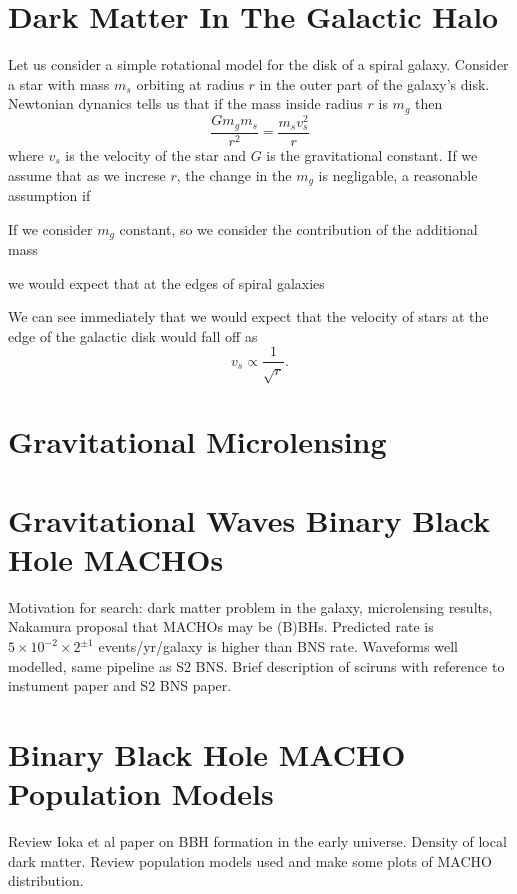 
\section{Dark Matter In The Galactic Halo}

Let us consider a simple rotational model for the disk of a spiral galaxy.
Consider a star with mass $m_s$ orbiting at radius $r$ in the outer part
of the galaxy's disk. Newtonian dynanics tells us that if the mass inside
radius $r$ is $m_g$ then
\begin{equation}
\frac{Gm_g m_s}{r^2} = \frac{m_s v_s^2}{r}
\end{equation}
where $v_s$ is the velocity of the star and $G$ is the gravitational constant. 
If we assume that as we increse $r$, the change in the $m_g$ is negligable, a
reasonable assumption if

If 
we consider $m_g$ constant, so
we consider the contribution of the additional mass 


we would expect that at the edges of spiral galaxies 

We can see immediately that we would expect that the velocity of stars at the
edge of the galactic disk would fall off as 
\begin{equation}
v_s \propto \frac{1}{\sqrt{r}}.
\end{equation}


\section{Gravitational Microlensing}

\section{Gravitational Waves Binary Black Hole MACHOs}

Motivation for search: dark matter problem in the galaxy, microlensing
results, Nakamura proposal that MACHOs may be (B)BHs. Predicted rate is
$5\times10^{-2}\times2^{\pm 1}$ events/yr/galaxy is higher than BNS rate.
Waveforms well modelled, same pipeline as S2 BNS. Brief description of sciruns
with reference to instument paper and S2 BNS paper.

\section{Binary Black Hole MACHO Population Models}

Review Ioka et al paper on BBH formation in the early universe. Density of
local dark matter. Review population models used and make some plots of MACHO
distribution.

